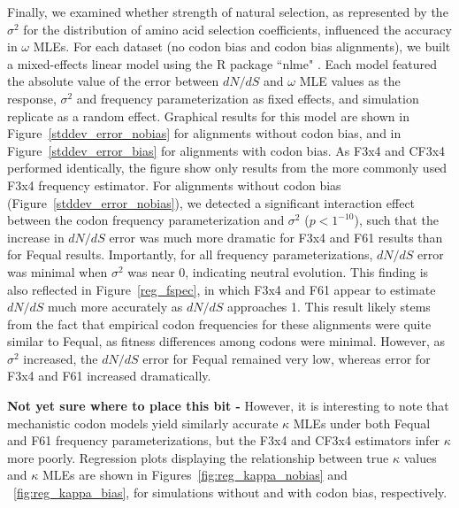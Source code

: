 \documentclass[11pt]{article}
\begin{document}
Finally, we examined whether strength of natural selection, as represented by the $\sigma^2$ for the distribution of amino acid selection coefficients, influenced the accuracy in $\omega$ MLEs. For each dataset (no codon bias and codon bias alignments), we built a mixed-effects linear model using the R package ``nlme" \cite{NLME}. Each model featured the absolute value of the error between $dN/dS$ and $\omega$ MLE values as the response, $\sigma^2$ and frequency parameterization as fixed effects, and simulation replicate as a random effect. Graphical results for this model are shown in Figure~\ref{stddev_error_nobias} for alignments without codon bias, and in Figure~\ref{stddev_error_bias} for alignments with codon bias. As F3x4 and CF3x4 performed identically, the figure show only results from the more commonly used F3x4 frequency estimator. For alignments without codon bias (Figure~\ref{stddev_error_nobias}), we detected a significant interaction effect between the codon frequency parameterization and $\sigma^2$ ($p < 1^{-10}$), such that the increase in $dN/dS$ error was much more dramatic for F3x4 and F61 results than for Fequal results. Importantly, for all frequency parameterizations, $dN/dS$ error was minimal when $\sigma^2$ was near 0, indicating neutral evolution. This finding is also reflected in Figure~\ref{reg_fspec}, in which F3x4 and F61 appear to estimate $dN/dS$ much more accurately as $dN/dS$ approaches 1. This result likely stems from the fact that empirical codon frequencies for these alignments were quite similar to Fequal, as fitness differences among codons were minimal. However, as $\sigma^2$ increased, the $dN/dS$ error for Fequal remained very low, whereas error for F3x4 and F61 increased dramatically. 



\textbf{Not yet sure where to place this bit - } However, it is interesting to note that mechanistic codon models yield similarly accurate $\kappa$ MLEs under both Fequal and F61 frequency parameterizations, but the F3x4 and CF3x4 estimators infer $\kappa$ more poorly. Regression plots displaying the relationship between true $\kappa$ values and $\kappa$ MLEs are shown in Figures~\ref{fig:reg_kappa_nobias} and ~\ref{fig:reg_kappa_bias}, for simulations without and with codon bias, respectively.
\end{document}
